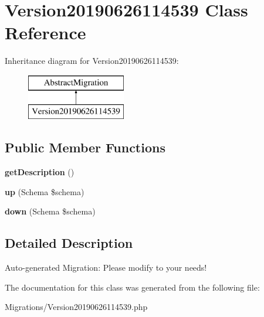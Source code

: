 \hypertarget{class_doctrine_migrations_1_1_version20190626114539}{}\section{Version20190626114539 Class Reference}
\label{class_doctrine_migrations_1_1_version20190626114539}
Inheritance diagram for Version20190626114539\+:\begin{figure}[H]
\begin{center}
\leavevmode
\includegraphics[height=2.000000cm]{class_doctrine_migrations_1_1_version20190626114539}
\end{center}
\end{figure}
\subsection*{Public Member Functions}
\begin{DoxyCompactItemize}
\item 
\mbox{\label{class_doctrine_migrations_1_1_version20190626114539_a2e7bb35c71bf1824456ceb944cb7a845}} 
{\bfseries get\+Description} ()
\item 
\mbox{\label{class_doctrine_migrations_1_1_version20190626114539_a23eb1c1428e8ea2ab2cf798fc06ec421}} 
{\bfseries up} (Schema \$schema)
\item 
\mbox{\label{class_doctrine_migrations_1_1_version20190626114539_aa8eb70255a46429d4d6165c778c9e5b9}} 
{\bfseries down} (Schema \$schema)
\end{DoxyCompactItemize}


\subsection{Detailed Description}
Auto-\/generated Migration\+: Please modify to your needs! 

The documentation for this class was generated from the following file\+:\begin{DoxyCompactItemize}
\item 
Migrations/Version20190626114539.\+php\end{DoxyCompactItemize}
